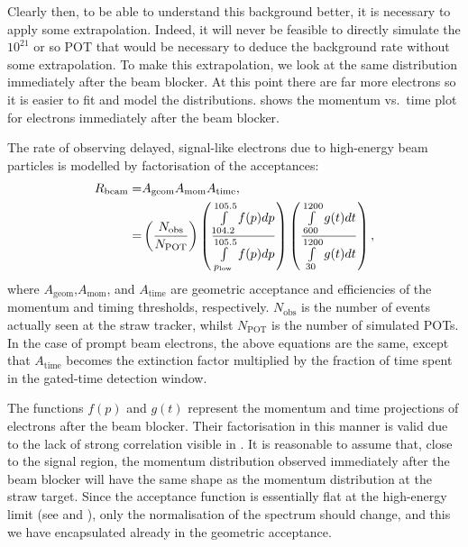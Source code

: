 Clearly then, to be able to understand this background better, it is necessary to apply some extrapolation.
Indeed, it will never be feasible to directly simulate the $10^{21}$ or so POT that would be necessary to deduce the background rate without some extrapolation.
To make this extrapolation, we look at the same distribution immediately after the beam blocker.  
At this point there are far more electrons so it is easier to fit and model the distributions.
 shows the momentum vs.\ time plot for electrons immediately after the beam blocker.

The rate of observing delayed, signal-like electrons due to high-energy beam particles is modelled by factorisation of the acceptances:
\begin{align}
R_\mathrm{beam}=&A_\textrm{geom}A_\textrm{mom}A_\textrm{time},\\
=&\left(\frac{N_\textrm{obs}}{N_\textrm{POT}}\right)\left(\frac{\int\limits_{104.2}^{105.5}f(p)dp}{\int\limits_{p_\textrm{low}}^{105.5}f(p)dp}\right)\left(\frac{\int\limits_{600}^{1200}g(t)dt}{\int\limits_{30}^{1200}g(t)dt}\right),
\eqlabel{bg:beam:factors}
\end{align}
where $A_\textrm{geom}$,$A_\textrm{mom}$, and $A_\textrm{time}$ are geometric acceptance and efficiencies of the momentum and timing thresholds, respectively.
$N_\textrm{obs}$ is the number of events actually seen at the straw tracker, whilst $N_\textrm{POT}$ is the number of simulated \acp{POT}.
In the case of prompt beam electrons, the above equations are the same, except that $A_\textrm{time}$ becomes the extinction factor multiplied by the fraction of time spent in the gated-time detection window.
\FigBgBeamExtrapolate

The functions $f(p)$ and $g(t)$ represent the momentum and time projections of electrons after the beam blocker. 
Their factorisation in this manner is valid due to the lack of strong correlation visible in .
It is reasonable to assume that, close to the signal region, the momentum distribution observed immediately after the beam blocker will have the same shape as the momentum distribution at the straw target.
Since the acceptance function is essentially flat at the high-energy limit (see  and ), only the normalisation of the spectrum should change, and this we have encapsulated already in the geometric acceptance.

